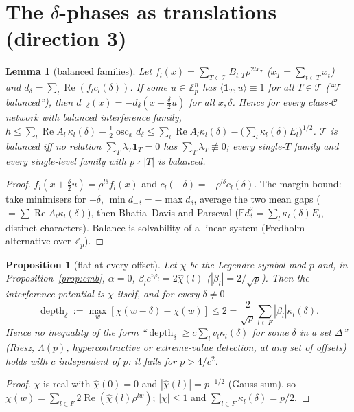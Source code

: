 \documentclass[11pt]{article}
\newtheorem{lemma}[theorem]{Lemma}
\newtheorem{proposition}[theorem]{Proposition}
\theoremstyle{remark}
\renewcommand{\Re}{\operatorname{Re}}
\begin{document}
\section{The $\delta$-phases as translations (direction 3)}

\begin{lemma}[balanced families]\label{lem:bal}
Let $f_l(x)=\sum_{T\in\mathcal T}B_{l,T}\rho^{2lx_T}$ ($x_T=\sum_{t\in T}x_t$) and $d_\delta=\sum_l\Re(f_lc_l(\delta))$.
If some $u\in\mathbb Z_p^n$ has $\langle\mathbf 1_T,u\rangle\equiv1$ for all $T\in\mathcal T$ (``$\mathcal T$ balanced''), then
$d_{-\delta}(x)=-d_\delta(x+\tfrac\delta2u)$ for all $x,\delta$. Hence for every class-$\mathcal C$ network with balanced interference family,
$h\le\sum_l\Re A_l\,\kappa_l(\delta)-\tfrac12\operatorname{osc}_xd_\delta\le\sum_l\Re A_l\kappa_l(\delta)-\big(\sum_l\kappa_l(\delta)E_l\big)^{1/2}$.
$\mathcal T$ is balanced iff no relation $\sum_T\lambda_T\mathbf 1_T=0$ has $\sum_T\lambda_T\not\equiv0$; every single-$T$ family and every
single-level family with $p\nmid|T|$ is balanced.
\end{lemma}
\begin{proof}
$f_l(x+\frac\delta2u)=\rho^{l\delta}f_l(x)$ and $c_l(-\delta)=-\rho^{l\delta}c_l(\delta)$. The margin bound: take minimisers for $\pm\delta$,
$\min d_{-\delta}=-\max d_\delta$, average the two mean gaps ($=\sum\Re A_l\kappa_l(\delta)$), then Bhatia--Davis and Parseval
($\mathbb Ed_\delta^2=\sum_l\kappa_l(\delta)E_l$, distinct characters). Balance is solvability of a linear system (Fredholm alternative over $\mathbb Z_p$).
\end{proof}

\begin{proposition}[flat at every offset]\label{prop:leg}
Let $\chi$ be the Legendre symbol mod $p$ and, in Proposition~\ref{prop:emb}, $\alpha=0$, $\beta_le^{i\varphi_l}=2\widehat\chi(l)$
($|\beta_l|=2/\sqrt p$). Then the interference potential is $\chi$ itself, and for \emph{every} $\delta\ne0$
\[
\operatorname{depth}_\delta:=\max_w[\chi(w-\delta)-\chi(w)]\le2=\frac2{\sqrt p}\sum_{l\in F}|\beta_l|\kappa_l(\delta).
\]
Hence no inequality of the form ``$\operatorname{depth}_\delta\ge c\sum_l v_l\kappa_l(\delta)$ for some $\delta$ in a set $\Delta$'' (Riesz, $\Lambda(p)$,
hypercontractive or extreme-value detection, at any set of offsets) holds with $c$ independent of $p$: it fails for $p>4/c^2$.
\end{proposition}
\begin{proof}
$\chi$ is real with $\widehat\chi(0)=0$ and $|\widehat\chi(l)|=p^{-1/2}$ (Gauss sum), so $\chi(w)=\sum_{l\in F}2\Re(\widehat\chi(l)\rho^{lw})$;
$|\chi|\le1$ and $\sum_{l\in F}\kappa_l(\delta)=p/2$.
\end{proof}
\end{document}
